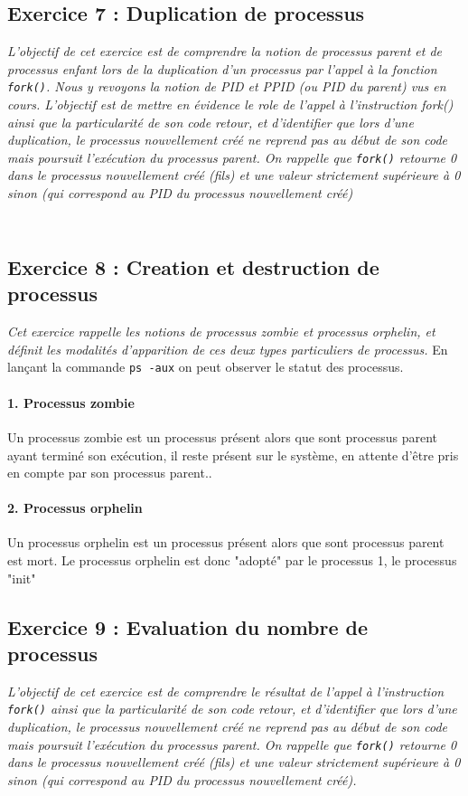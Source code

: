 \subsection{Exercice 7 : Duplication de processus}
\textit{L’objectif de cet exercice est de comprendre la notion de processus parent et de processus enfant lors de la duplication d’un processus par l’appel à la fonction \texttt{fork()}. Nous y revoyons la notion de PID et PPID (ou PID du parent) vus en cours. L’objectif est de mettre en évidence le role de l’appel à l’instruction fork() ainsi que la particularité de son code retour, et d’identifier que lors d’une duplication, le processus nouvellement créé ne reprend pas au début de son code mais poursuit l’exécution du processus parent. On rappelle que \texttt{fork()} retourne 0 dans le processus nouvellement créé (fils) et une valeur strictement supérieure à 0 sinon (qui correspond au PID du processus nouvellement créé)}

\inputminted[linenos,firstline=9, lastline=27]{cpp}{../sources/cpp/TP5-6/ex7-fork1.c}
\inputminted[linenos,firstline=9, lastline=30]{cpp}{../sources/cpp/TP5-6/ex7-fork2.c}

\subsection{Exercice 8 : Creation et destruction de processus}
\textit{Cet exercice rappelle les notions de processus zombie et processus orphelin, et définit les modalités d’apparition de ces deux types particuliers de processus.}
En lançant la commande \texttt{ps -aux} on peut observer le statut des processus.

\paragraph{1. Processus zombie}
Un processus zombie est un processus présent alors que sont processus parent ayant terminé son exécution, il reste présent sur le système, en attente d'être pris en compte par son processus parent..

\paragraph{2. Processus orphelin}
Un processus orphelin est un processus présent alors que sont processus parent est mort. Le processus orphelin est donc "adopté" par le processus 1, le processus "init"

\subsection{Exercice 9 : Evaluation du nombre de processus}
\textit{L’objectif de cet exercice est de comprendre le résultat de l’appel à l’instruction \texttt{fork()} ainsi que la particularité de son code retour, et d’identifier que lors d’une duplication, le processus nouvellement créé ne reprend pas au début de son code mais poursuit l’exécution du processus parent. On rappelle que \texttt{fork()} retourne 0 dans le processus nouvellement créé (fils) et une valeur strictement supérieure à 0 sinon (qui correspond au PID du processus nouvellement créé).}

